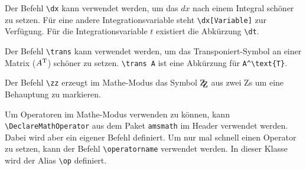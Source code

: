 \documentclass{exercise}
\begin{document}
    Der Befehl \lstinline-\dx- kann verwendet werden, um das $dx$ nach einem Integral schöner zu setzen. Für eine andere Integrationsvariable steht \lstinline-\dx[Variable]- zur Verfügung. Für die Integrationsvariable $t$ existiert die Abkürzung \lstinline-\dt-.

    Der Befehl \lstinline-\trans- kann verwendet werden, um das Transponiert-Symbol an einer Matrix (${A}^\text{T}$) schöner zu setzen. \lstinline-\trans A- ist eine Abkürzung für \lstinline-A^\text{T}-.

    Der Befehl \lstinline-\zz- erzeugt im Mathe-Modus das
    Symbol $\zz{}$ aus zwei Zs um eine Behauptung zu markieren.

    Um Operatoren im Mathe-Modus verwenden zu können, kann \lstinline-\DeclareMathOperator-
    aus dem Paket \texttt{amsmath} \cite{amsmath} im Header verwendet werden.
    Dabei wird aber ein eigener Befehl definiert.
    Um nur mal schnell
    einen Operator zu setzen, kann der Befehl \lstinline-\operatorname- verwendet werden.
    In dieser Klasse wird der Alias \lstinline-\op- definiert.
\end{document}
